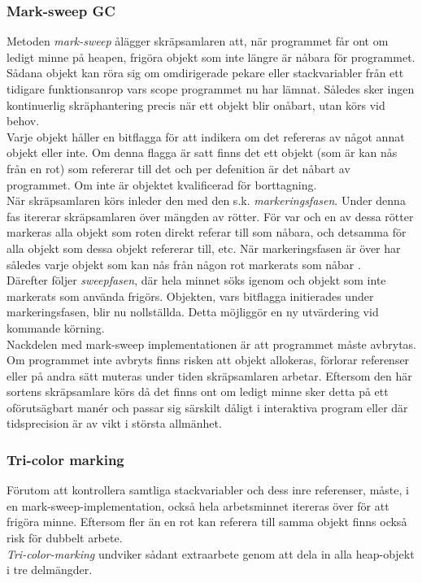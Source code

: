 \documentclass{article}
\begin{document}
\subsubsection{Mark-sweep GC}
Metoden \textit{mark-sweep} ålägger skräpsamlaren att, när programmet får ont om ledigt minne på heapen, frigöra objekt som inte längre är nåbara för programmet. Sådana objekt kan röra sig om omdirigerade pekare eller stackvariabler från ett tidigare funktionsanrop vars scope programmet nu har lämnat. Således sker ingen kontinuerlig skräphantering precis när ett objekt blir onåbart, utan körs vid behov.\newline
\\
Varje objekt håller en bitflagga för att indikera om det refereras av något annat objekt eller inte. Om denna flagga är satt finns det ett objekt (som är kan nås från en rot) som refererar till det och per defenition är det nåbart av programmet. Om inte är objektet kvalificerad för borttagning.\newline
\\
När skräpsamlaren körs inleder den med den s.k. \textit{markeringsfasen}. Under denna fas itererar skräpsamlaren över mängden av rötter. För var och en av dessa rötter markeras alla objekt som roten direkt referar till som nåbara, och detsamma för alla objekt som dessa objekt refererar till, etc. När markeringsfasen är över har således varje objekt som kan nås från någon rot markerats som nåbar \cite{agarwal}.\newline
\\
Därefter följer \textit{sweepfasen}, där hela minnet söks igenom och objekt som inte markerats som använda frigörs. Objekten, vars bitflagga initierades under markeringsfasen, blir nu nollställda. Detta möjliggör en ny utvärdering vid kommande körning\cite{agarwal}.\newline
\\
Nackdelen med mark-sweep implementationen är att programmet måste avbrytas. Om programmet inte avbryts finns risken att objekt allokeras, förlorar referenser eller på andra sätt muteras under tiden skräpsamlaren arbetar. Eftersom den här sortens skräpsamlare körs då det finns ont om ledigt minne sker detta på ett oförutsägbart manér och passar sig särskilt dåligt i interaktiva program eller där tidsprecision är av vikt i största allmänhet.\newline


\subsubsection{Tri-color marking}
Förutom att kontrollera samtliga stackvariabler och dess inre referenser, måste, i en mark-sweep-implementation, också hela arbetsminnet itereras över för att frigöra minne. Eftersom fler än en rot kan referera till samma objekt finns också risk för dubbelt arbete.\newline
\\
\textit{Tri-color-marking} undviker sådant extraarbete genom att dela in alla heap-objekt i tre delmängder. 
\end{document}
